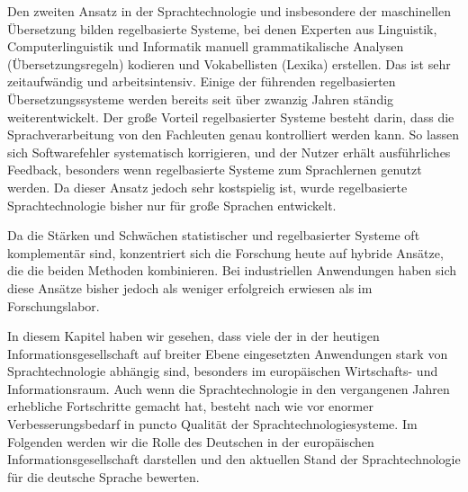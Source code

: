 \documentclass[]{../../metanetpaper}
\begin{document}
\begin{Parallel}[c]{79mm}{78mm}
{Den zweiten Ansatz in der Sprachtechnologie und insbesondere der maschinellen Übersetzung bilden regelbasierte Systeme, bei denen Experten aus Linguistik, Computerlinguistik und Informatik manuell grammatikalische Analysen (Übersetzungsregeln) kodieren und Vokabellisten (Lexika) erstellen. Das ist sehr zeitaufwändig und arbeitsintensiv. Einige der führenden regelbasierten Übersetzungssysteme werden bereits seit über zwanzig Jahren ständig weiterentwickelt. Der große Vorteil regelbasierter Systeme besteht darin, dass die Sprachverarbeitung von den Fachleuten genau kontrolliert werden kann. So lassen sich Softwarefehler systematisch korrigieren, und der Nutzer erhält ausführliches Feedback, besonders wenn regelbasierte Systeme zum  Sprachlernen genutzt werden. Da dieser Ansatz jedoch sehr kostspielig ist, wurde regelbasierte Sprachtechnologie bisher nur für große Sprachen entwickelt. 

Da die Stärken und Schwächen statistischer und regelbasierter Systeme oft komplementär sind, konzentriert sich die Forschung heute auf hybride Ansätze, die die beiden Methoden kombinieren. Bei industriellen Anwendungen haben sich diese Ansätze bisher jedoch als weniger erfolgreich erwiesen als im Forschungslabor. 

In diesem Kapitel haben wir gesehen, dass viele der in der heutigen Informationsgesellschaft auf breiter Ebene eingesetzten Anwendungen stark von Sprachtechnologie abhängig sind, besonders im europäischen Wirtschafts- und Informationsraum. Auch wenn die Sprachtechnologie in den vergangenen Jahren erhebliche Fortschritte gemacht hat, besteht nach wie vor enormer Verbesserungsbedarf in puncto Qualität der Sprachtechnologiesysteme. Im Folgenden werden wir die Rolle des Deutschen in der europäischen Informationsgesellschaft darstellen und den aktuellen Stand der Sprachtechnologie für die deutsche Sprache bewerten.
  }

\end{Parallel}
\end{document}
